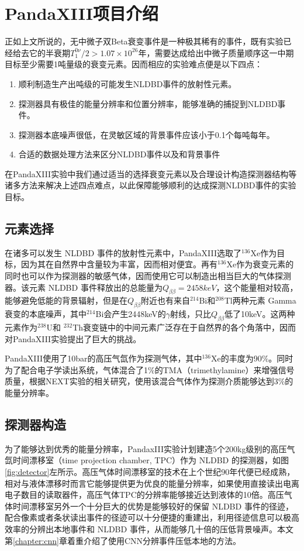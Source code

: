 \chapter{PandaXIII项目介绍}
\label{chapter:intro}

正如上文所说的，无中微子双Beta衰变事件是一种极其稀有的事件，既有实验已经给去它的半衰期$T^{0\nu}_1/2>1.07\times10^{26}$年，需要达成给出中微子质量顺序这一中期目标至少需要1吨量级的衰变元素。因而相应的实验难点便是以下四点：
\begin{enumerate}
    \item 顺利制造生产出吨级的可能发生NLDBD事件的放射性元素。
    \item 探测器具有极佳的能量分辨率和位置分辨率，能够准确的捕捉到NLDBD事件。
    \item 探测器本底噪声很低，在灵敏区域的背景事件应该小于0.1个每吨每年。
    \item 合适的数据处理方法来区分NLDBD事件以及和背景事件
\end{enumerate}
在PandaXIII实验中我们通过适当的选择衰变元素以及合理设计构造探测器结构等诸多方法来解决上述四点难点，以此保障能够顺利的达成探测NLDBD事件的实验目标。

\section{元素选择}

在诸多可以发生 NLDBD 事件的放射性元素中，PandaXIII选取了$^{136}$Xe作为目标，因为其在自然界中含量较为丰富，因而相对便宜。再有$^{136}$Xe作为衰变元素的同时也可以作为探测器的敏感气体，因而使用它可以制造出相当巨大的气体探测器。该元素 NLDBD 事件释放出的总能量为$Q_{\beta\beta}=2458keV$，这个能量相对较高，能够避免低能的背景辐射，但是在$Q_{\beta\beta}$附近也有来自$^{214}$Bi和$^{208}$Tl两种元素 Gamma 衰变的本底噪声，其中$^{214}$Bi会产生2448keV的$\gamma$射线，只比$Q_{\beta\beta}$低了10keV。这两种元素作为$^{238}$U和
$^{232}$Th衰变链中的中间元素广泛存在于自然界的各个角落中，因而对PandaXIII实验提出了巨大的挑战。

PandaXIII使用了10bar的高压气氙作为探测气体，其中$^{136}$Xe的丰度为90\%。同时为了配合电子学读出系统，气体混合了1\%的TMA（trimethylamine）来增强信号质量，根据NEXT实验的相关研究，使用该混合气体作为探测介质能够达到3\%的能量分辨率\supercite{azevedoh2015accurate}。

\section{探测器构造}
\label{section:detector}
为了能够达到优秀的能量分辨率，PandaxIII实验计划建造5个200kg级别的高压气氙时间漂移室（time projection chamber, TPC）作为 NLDBD 的探测器，如图\ref{fig:detector}左所示。高压气体时间漂移室的技术在上个世纪90年代便已经成熟，相对与液体漂移时而言它能够提供更为优良的能量分辨率，如果使用直接读出电离电子数目的读取器件，高压气体TPC的分辨率能够接近达到液体的10倍。高压气体时间漂移室另外一个十分巨大的优势是能够较好的保留 NLDBD 事件的径迹，配合像素或者条状读出事件的径迹可以十分便捷的重建出，利用径迹信息可以极高效率的分辨出本地事件和 NLDBD 事件，从而能够几十倍的压低背景噪声。本文第\ref{chapter:cnn}章着重介绍了使用CNN分辨事件压低本地的方法。

